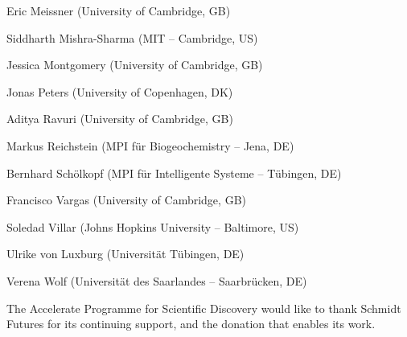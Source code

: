 Eric Meissner (University of Cambridge, GB)

Siddharth Mishra-Sharma (MIT -- Cambridge, US)

Jessica Montgomery (University of Cambridge, GB)

Jonas Peters (University of Copenhagen, DK)

Aditya Ravuri (University of Cambridge, GB)

Markus Reichstein (MPI für Biogeochemistry -- Jena, DE)

Bernhard Schölkopf (MPI für Intelligente Systeme -- Tübingen, DE)

Francisco Vargas (University of Cambridge, GB)

Soledad Villar (Johns Hopkins University -- Baltimore, US)

Ulrike von Luxburg (Universität Tübingen, DE)

Verena Wolf (Universität des Saarlandes -- Saarbrücken, DE)

The Accelerate Programme for Scientific Discovery would like to thank
Schmidt Futures for its continuing support, and the donation that
enables its work.
